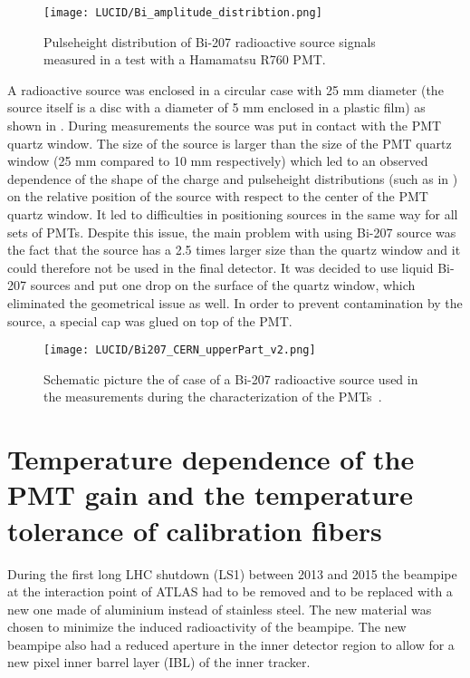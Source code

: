 \begin{figure}
\centering
\texttt{[image: LUCID/Bi\_amplitude\_distribtion.png]}
\caption{Pulseheight distribution of Bi-207 radioactive source signals measured in a test with a Hamamatsu R760 PMT.}
\label{fig:pulseheight_Bi207}
\end{figure}

A radioactive source was enclosed in a circular case with 25 mm diameter 
(the source itself is a disc with a diameter of 5 mm enclosed in a plastic film) as shown in .
During measurements the source was put in contact with the PMT quartz window.
The size of the source is larger than the size of the PMT quartz window (25 mm compared to 10 mm respectively) which led to an observed dependence of the shape of the charge and pulseheight distributions (such as in ) on the relative position of the source 
with respect to the center of the PMT quartz window.
It led to difficulties in positioning sources in the same way for all sets of PMTs.
Despite this issue, the main problem with using Bi-207 source was the fact that the source has a 2.5 times larger size than the quartz window
and it could therefore not be used in the final detector.
It was decided to use liquid Bi-207 sources and put one drop on the surface of the quartz window, which eliminated the geometrical issue as well.
In order to prevent contamination by the source, a special cap was glued on top of the PMT.
 
\begin{figure}
\centering
\texttt{[image: LUCID/Bi207\_CERN\_upperPart\_v2.png]}
\caption{Schematic picture the of case of a Bi-207 radioactive source used in the measurements during the characterization of the PMTs~\cite{Alberghi:2016tad}.}
\label{fig:Bi207_case}
\end{figure}

\section{Temperature dependence of the PMT gain and the temperature tolerance of calibration fibers}
\label{sec:tempMeas}

During the first long LHC shutdown (LS1) between 2013 and 2015 the beampipe at the interaction point of ATLAS
had to be removed and to be replaced with a new one made of aluminium instead of stainless steel.
The new material was chosen to minimize the induced radioactivity of the beampipe.
The new beampipe also had a reduced aperture in the inner detector region to allow for a new pixel inner barrel layer (IBL) of the inner tracker.

